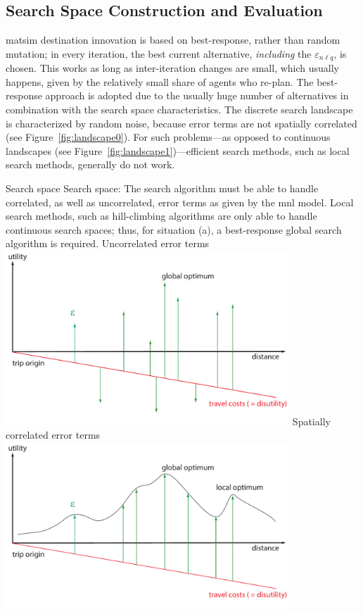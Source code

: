 \subsection{Search Space Construction and Evaluation}
\gls{matsim} destination innovation is based on best-response, rather than random mutation; in every iteration, the best current alternative, \emph{including} the $\varepsilon_{n \ell q}$, is chosen. 
This works as long as inter-iteration changes are small, which usually happens, given by the relatively small share of agents who re-plan. 
The best-response approach is adopted due to the usually huge number of alternatives in combination with the search space characteristics. 
The discrete search landscape is characterized by random noise, because error terms are not spatially correlated (see Figure~\ref{fig:landscape0}). For such problems---as opposed to continuous landscapes (see Figure~\ref{fig:landscape1})---efficient search methods, such as local search methods, generally do not work.

\createfigure%
{Search space}%
{Search space: The search algorithm must be able to handle correlated, as well as uncorrelated, error terms as given by the \gls{mnl} model. Local search methods, such as hill-climbing algorithms are only able to handle continuous search spaces; thus, for situation (a), a best-response global search algorithm is required.}%
{\label{fig:landscape}}%
{%
  \createsubfigure%
  {Uncorrelated error terms}%
  {\includegraphics[width=0.8\textwidth,angle=0]{extending/figures/dc/landscape1.pdf}}%
  {\label{fig:landscape0}}%
  {}%
  \createsubfigure%
  {Spatially correlated error terms}%
	{\includegraphics[width=0.8\textwidth,angle=0]{extending/figures/dc/landscape0.pdf}}%
  {\label{fig:landscape1}}%
  {}%
}%
{}

